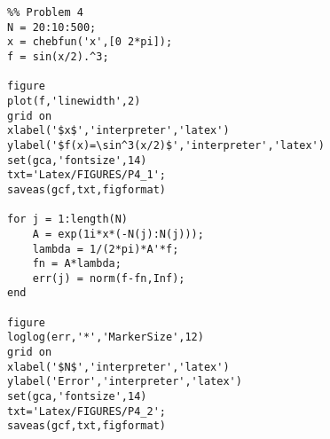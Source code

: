 \begin{verbatim}
%% Problem 4
N = 20:10:500;
x = chebfun('x',[0 2*pi]);
f = sin(x/2).^3;

figure
plot(f,'linewidth',2)
grid on
xlabel('$x$','interpreter','latex')
ylabel('$f(x)=\sin^3(x/2)$','interpreter','latex')
set(gca,'fontsize',14)
txt='Latex/FIGURES/P4_1';
saveas(gcf,txt,figformat)

for j = 1:length(N)
    A = exp(1i*x*(-N(j):N(j)));
    lambda = 1/(2*pi)*A'*f;
    fn = A*lambda;
    err(j) = norm(f-fn,Inf);
end

figure
loglog(err,'*','MarkerSize',12)
grid on
xlabel('$N$','interpreter','latex')
ylabel('Error','interpreter','latex')
set(gca,'fontsize',14)
txt='Latex/FIGURES/P4_2';
saveas(gcf,txt,figformat)
\end{verbatim}